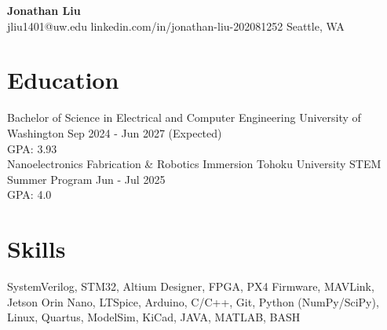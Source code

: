 \documentclass[11pt,letterpaper]{article}
\begin{document}
\begin{center}
{\LARGE \textbf{Jonathan Liu}}\\[2pt]
\small jliu1401@uw.edu \textbullet{} linkedin.com/in/jonathan-liu-202081252 \textbullet{} Seattle, WA
\end{center}
\section*{Education}
\noindent Bachelor of Science in Electrical and Computer Engineering \textbar{} University of Washington \textbar{} Sep 2024 - Jun 2027 (Expected)\\
GPA: 3.93\\
\noindent Nanoelectronics Fabrication \& Robotics Immersion \textbar{} Tohoku University STEM Summer Program \textbar{} Jun - Jul 2025\\
GPA: 4.0\\
\section*{Skills}
SystemVerilog, STM32, Altium Designer, FPGA, PX4 Firmware, MAVLink, Jetson Orin Nano, LTSpice, Arduino, C/C++, Git, Python (NumPy/SciPy), Linux, Quartus, ModelSim, KiCad, JAVA, MATLAB, BASH
\end{document}
